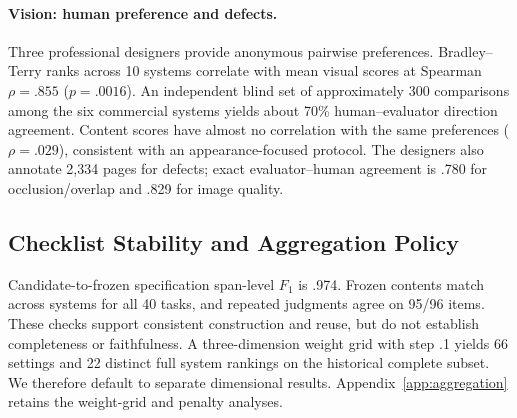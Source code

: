 \paragraph{Vision: human preference and defects.}
Three professional designers provide anonymous pairwise preferences. Bradley--Terry ranks across 10 systems correlate with mean visual scores at Spearman $\rho=.855$ ($p=.0016$). An independent blind set of approximately 300 comparisons among the six commercial systems yields about 70\% human--evaluator direction agreement. Content scores have almost no correlation with the same preferences ($\rho=.029$), consistent with an appearance-focused protocol. The designers also annotate 2,334 pages for defects; exact evaluator--human agreement is .780 for occlusion/overlap and .829 for image quality.

\subsection{Checklist Stability and Aggregation Policy}
Candidate-to-frozen specification span-level $F_1$ is .974. Frozen contents match across systems for all 40 tasks, and repeated judgments agree on 95/96 items. These checks support consistent construction and reuse, but do not establish completeness or faithfulness. A three-dimension weight grid with step .1 yields 66 settings and 22 distinct full system rankings on the historical complete subset. We therefore default to separate dimensional results. Appendix~\ref{app:aggregation} retains the weight-grid and penalty analyses.
